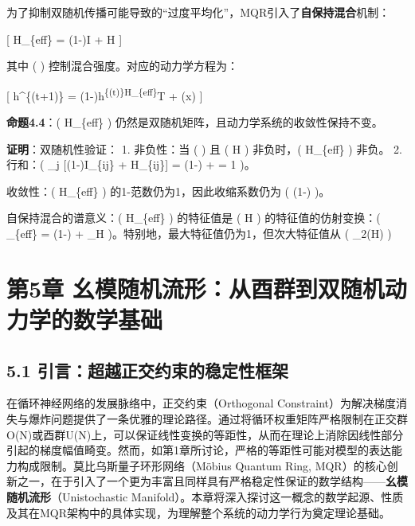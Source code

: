 \documentclass[
  12pt,
]{article}
\begin{document}
为了抑制双随机传播可能导致的``过度平均化''，MQR引入了\textbf{自保持混合}机制：

{[} H\_\{eff\} = (1-\beta)I + \beta H {]}

其中 ( \beta \in [0,1] ) 控制混合强度。对应的动力学方程为：

{[} h\^{}\{(t+1)\} = (1-\alpha)h\textsuperscript{\{(t)\}H\_\{eff\}}T +
\alphaJ(x) {]}

\textbf{命题4.4}：( H\_\{eff\} )
仍然是双随机矩阵，且动力学系统的收敛性保持不变。

\textbf{证明}：双随机性验证： 1. 非负性：当 ( \beta \in [0,1] ) 且 ( H )
非负时，( H\_\{eff\} ) 非负。 2. 行和：( \sum\_j {[}(1-\beta)I\_\{ij\} +
\beta H\_\{ij\}{]} = (1-\beta)  + \beta {} = 1 )。

收敛性：( H\_\{eff\} ) 的1-范数仍为1，因此收缩系数仍为 ( (1-\alpha) )。

自保持混合的谱意义：( H\_\{eff\} ) 的特征值是 ( H )
的特征值的仿射变换：( \lambda\_\{eff\} = (1-\beta) + \beta\lambda\_H
)。特别地，最大特征值仍为1，但次大特征值从 ( \lambda\_2(H) )

\hypertarget{ux7b2c5ux7ae0-ux5e7aux6a21ux968fux673aux6d41ux5f62ux4eceux9149ux7fa4ux5230ux53ccux968fux673aux52a8ux529bux5b66ux7684ux6570ux5b66ux57faux7840}{%
\section{第5章
幺模随机流形：从酉群到双随机动力学的数学基础}\label{ux7b2c5ux7ae0-ux5e7aux6a21ux968fux673aux6d41ux5f62ux4eceux9149ux7fa4ux5230ux53ccux968fux673aux52a8ux529bux5b66ux7684ux6570ux5b66ux57faux7840}}

\hypertarget{ux5f15ux8a00ux8d85ux8d8aux6b63ux4ea4ux7ea6ux675fux7684ux7a33ux5b9aux6027ux6846ux67b6}{%
\subsection{5.1
引言：超越正交约束的稳定性框架}\label{ux5f15ux8a00ux8d85ux8d8aux6b63ux4ea4ux7ea6ux675fux7684ux7a33ux5b9aux6027ux6846ux67b6}}

在循环神经网络的发展脉络中，正交约束（Orthogonal
Constraint）为解决梯度消失与爆炸问题提供了一条优雅的理论路径。通过将循环权重矩阵严格限制在正交群O(N)或酉群U(N)上，可以保证线性变换的等距性，从而在理论上消除因线性部分引起的梯度幅值畸变。然而，如第1章所讨论，严格的等距性可能对模型的表达能力构成限制。莫比乌斯量子环形网络（Möbius
Quantum Ring,
MQR）的核心创新之一，在于引入了一个更为丰富且同样具有严格稳定性保证的数学结构------\textbf{幺模随机流形}（Unistochastic
Manifold）。本章将深入探讨这一概念的数学起源、性质及其在MQR架构中的具体实现，为理解整个系统的动力学行为奠定理论基础。
\end{document}
